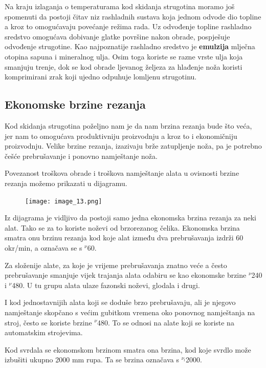 \documentclass[a4paper,12pt]{article}
\numberwithin{figure}{section}
\begin{document}
\begin{enumerate}
Na kraju izlaganja o temperaturama kod skidanja strugotina moramo još spomenuti da postoji čitav niz rashladnih sustava koja jednom odvode dio topline a kroz to omogućavaju povećanje režima rada. Uz odvođenje topline rashladno sredstvo omogućava dobivanje glatke površine nakon obrade, pospješuje odvođenje strugotine. Kao najpoznatije rashladno sredstvo je \textbf{emulzija} mlječna otopina sapuna i mineralnog ulja. Osim toga koriste se razne vrste ulja koja smanjuju trenje, dok se kod obrade ljevanog željeza za hlađenje noža koristi komprimirani zrak koji ujedno odpuhuje lomljenu strugotinu.
\end{enumerate}
\subsection{Ekonomske brzine rezanja}
Kod skidanja strugotina poželjno nam je da nam brzina rezanja bude što veća, jer nam to omogućava produktivniju proizvodnju a kroz to i ekonomičniju proizvodnju. Velike brzine rezanja, izazivaju brže zatupljenje noža, pa je potrebno češće prebrušavanje i ponovno namještanje noža. \par
Povezanost troškova obrade i troškova namještanje alata u ovisnosti brzine rezanja možemo prikazati u dijagramu.
\begin{figure}[!h]
\centering
\texttt{[image: image\_13.png]}
\end{figure}
\FloatBarrier
Iz dijagrama je vidljivo da postoji samo jedna ekonomska brzina rezanja za neki alat. Tako se za to koriste noževi od brzorezanog čelika. Ekonomska brzina smatra onu brzinu rezanja kod koje alat između dva prebrušavanja izdrži 60 okr/min, a označava se s $^{\nu}$60.\par 
Za složenije alate, za koje je vrijeme prebrušavanja znatno veće a često prebrušavanje smanjuje vijek trajanja alata odabiru se kao ekonomske brzine $^{\nu}$240 i $^{\nu}$480. U tu grupu alata ulaze fazonski noževi, glodala i drugi. \par
I kod jednostavnijih alata koji se doduše brzo prebrušavaju, ali je njegovo namještanje skopčano s većim gubitkom vremena oko ponovnog namještanja na stroj, često se koriste brzine $^{\nu}$480. To se odnosi na alate koji se koriste na automatskim strojevima. \par
Kod svrdala se ekonomskom brzinom smatra ona brzina, kod koje svrdlo može izbušiti ukupno 2000 mm rupa. Ta se brzina označava s $^{\nu_{l}}$2000.
\end{document}
